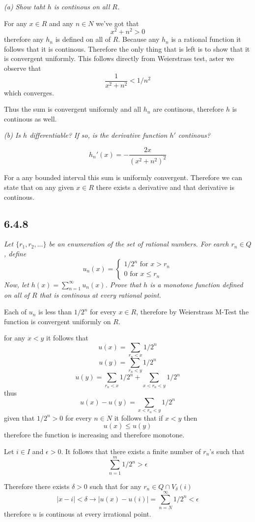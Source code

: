 \documentclass[11pt,oneside,titlepage]{book}
\begin{document}
\textit{(a) Show taht $h$ is continous on all $R$.}

For any $x \in R$ and any $n \in N$ we've got that
$$x^2 + n^2 > 0$$
therefore any $h_n$ is defined on all of $R$. Because any $h_n$ is a rational
function it follows that it is continous. Therefore the only thing that is left
is to show that it is convergent uniformly. This follows directly from
Weierstrass test, aster we observe that
$$\frac{1}{x^2 + n^2} < 1/n^2$$
which converges.

Thus the sum is convergent uniformly and all $h_n$ are continous, therefore
$h$ is continous as well.

\textit{(b) Is $h$ differentiable? If so, is the derivative function $h'$
  continous?}

$$h_n'(x) = -\frac{2x}{(x^2 + n^2)^2}$$

For a any bounded interval this sum is uniformly convergent. Therefore
we can state that on any given $x \in R$ there exists a derivative and
that derivative is continous.

\subsection*{6.4.8}
\textit{Let $\{r_1, r_2, ... \}$ be an enumeration of the set of rational
  numbers. For earch $r_n \in Q$, define  }
$$u_n(x) =
\begin{cases}
  1/2^n \text{ for } x > r_n \\
  0 \text{ for } x \leq r_n
\end{cases}
$$
\textit{Now, let $h(x) = \sum_{n = 1}^{\infty}u_n(x)$. Prove that $h$ is a
  monotone function defined on all of $R$ that is continous at every rational
  point.}


Each of $u_n$ is less than $1/2^n$ for every $x \in R$,
therefore by Weierstrass M-Test the function is convergent uniformly on $R$.


for any $x < y$ it follows that
$$u(x) = \sum_{r_n < x}{1/2^n}$$
$$u(y) = \sum_{r_n < y}{1/2^n}$$
$$u(y) = \sum_{r_n < x}{1/2^n} + \sum_{x < r_n < y}{1/2^n}$$
thus
$$u(x) - u(y) = \sum_{x < r_n < y}{1/2^n}$$
given that $1/2^n > 0$ for every $n \in N$ it follows that
if $x < y$ then 
$$u(x) \leq u(y)$$
therefore the function is increasing and therefore monotone.

Let $i \in I$ and $\epsilon > 0$. It follows that there exists
a finite number of $r_n$'s such that
$$\sum_{n = 1}^m{1/2^n} > \epsilon$$

Therefore  there exists $\delta > 0$
such that for any $r_n \in Q \cap V_\delta(i)$
$$|x - i|  < \delta \to
|u(x) - u(i)| =  \sum_{n = N}^{\infty}{1/2^n} < \epsilon$$
therefore $u$ is continous at every irrational point.
\end{document}
